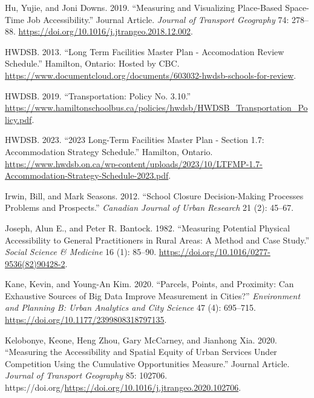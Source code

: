 \documentclass[
default
]{sn-jnl}
\newlength{\cslhangindent}
\newenvironment{CSLReferences}[2] %
 {\begin{list}{}{%
  \setlength{\itemindent}{0pt}
  \setlength{\leftmargin}{0pt}
  \setlength{\parsep}{0pt}
  \ifodd #1
   \setlength{\leftmargin}{\cslhangindent}
   \setlength{\itemindent}{-1\cslhangindent}
  \fi
  \setlength{\itemsep}{#2\baselineskip}}}
 {\end{list}}
\begin{document}
\begin{CSLReferences}{1}{0}
Hu, Yujie, and Joni Downs. 2019. {``Measuring and Visualizing
Place-Based Space-Time Job Accessibility.''} Journal Article.
\emph{Journal of Transport Geography} 74: 278--88.
\url{https://doi.org/10.1016/j.jtrangeo.2018.12.002}.

HWDSB. 2013. {``Long Term Facilities Master Plan - Accomodation Review
Schedule.''} Hamilton, Ontario: Hosted by {CBC}.
\url{https://www.documentcloud.org/documents/603032-hwdsb-schools-for-review}.

HWDSB. 2019. {``Transportation: Policy No. 3.10.''}
\url{https://www.hamiltonschoolbus.ca/policies/hwdsb/HWDSB_Transportation_Policy.pdf}.

HWDSB. 2023. {``2023 Long-Term Facilities Master Plan - Section 1.7:
Accommodation Strategy Schedule.''} Hamilton, Ontario.
\url{https://www.hwdsb.on.ca/wp-content/uploads/2023/10/LTFMP-1.7-Accommodation-Strategy-Schedule-2023.pdf}.

Irwin, Bill, and Mark Seasons. 2012. {``School {Closure Decision-Making
Processes Problems} and {Prospects}.''} \emph{Canadian Journal of Urban
Research} 21 (2): 45--67.

Joseph, Alun E., and Peter R. Bantock. 1982. {``Measuring Potential
Physical Accessibility to General Practitioners in Rural Areas: A Method
and Case Study.''} \emph{Social Science \& Medicine} 16 (1): 85--90.
\url{https://doi.org/10.1016/0277-9536(82)90428-2}.

Kane, Kevin, and Young-An Kim. 2020. {``Parcels, Points, and Proximity:
Can Exhaustive Sources of Big Data Improve Measurement in Cities?''}
\emph{Environment and Planning B: Urban Analytics and City Science} 47
(4): 695--715. \url{https://doi.org/10.1177/2399808318797135}.

Kelobonye, Keone, Heng Zhou, Gary McCarney, and Jianhong Xia. 2020.
{``Measuring the Accessibility and Spatial Equity of Urban Services
Under Competition Using the Cumulative Opportunities Measure.''} Journal
Article. \emph{Journal of Transport Geography} 85: 102706.
https://doi.org/\url{https://doi.org/10.1016/j.jtrangeo.2020.102706}.


\end{CSLReferences}
\end{document}
